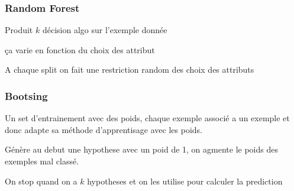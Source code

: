 \documentclass[12pt]{article}
\begin{document}
		\subsubsection{Random Forest}
			Produit $k$ décision algo sur l'exemple donnée
			
			ça varie en fonction du choix des attribut
			
			A chaque split on fait une restriction random des choix des attributs
			
		\subsubsection{Bootsing}
			Un set d'entrainement avec des poids, chaque exemple associé a un exemple et donc adapte sa méthode d'apprentisage avec les poids.
			
			Génère au debut une hypothese avec un poid de 1, on agmente le poids des exemples mal classé. 
			
			On stop quand on a $k$ hypotheses et on les utilise pour calculer la prediction
\end{document}

